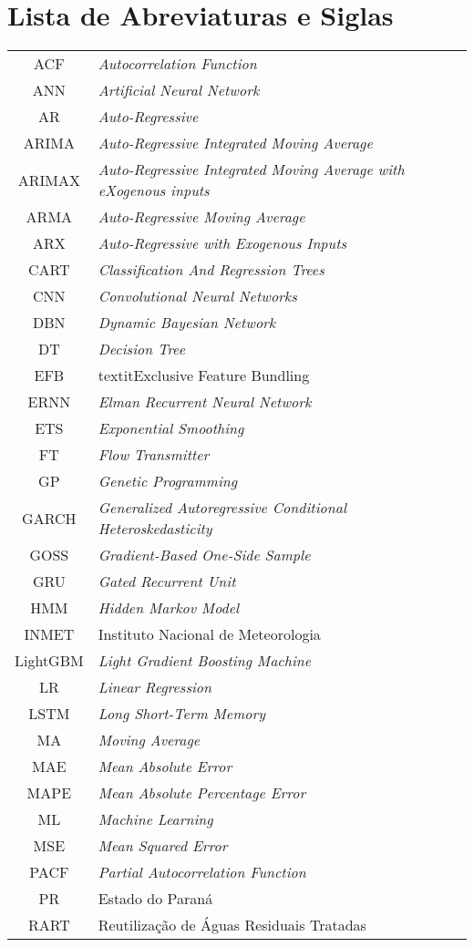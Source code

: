 \newpage
{}
\section*{Lista de Abreviaturas e Siglas}



\begin{tabular}{cp{}}
	ACF & \textit{Autocorrelation Function}\\
	ANN & \textit{Artificial Neural Network} \\
	AR & \textit{Auto-Regressive}\\
	ARIMA & \textit{Auto-Regressive Integrated Moving Average} \\
	ARIMAX & \textit{Auto-Regressive Integrated Moving Average with eXogenous inputs}\\
	ARMA & \textit{Auto-Regressive Moving Average} \\
	ARX & \textit{Auto-Regressive with Exogenous Inputs}\\
	CART & \textit{Classification And Regression Trees} \\
	CNN & \textit{Convolutional Neural Networks}\\
	DBN & \textit{Dynamic Bayesian Network} \\
	DT & \textit{Decision Tree} \\
	EFB & textit{Exclusive Feature Bundling}\\
	ERNN & \textit{Elman Recurrent Neural Network} \\
	ETS & \textit{Exponential Smoothing} \\
	FT & \textit{Flow Transmitter}\\
	GP & \textit{Genetic Programming}\\
	GARCH & \textit{Generalized Autoregressive Conditional Heteroskedasticity}\\
	GOSS & \textit{Gradient-Based One-Side Sample}\\
	GRU & \textit{Gated Recurrent Unit} \\
	HMM & \textit{Hidden Markov Model}\\
	INMET & Instituto Nacional de Meteorologia\\
	LightGBM & \textit{Light Gradient Boosting Machine} \\
	LR & \textit{Linear Regression}\\
	LSTM &\textit{Long Short-Term Memory}	\\
	MA & \textit{Moving Average}\\
	MAE & \textit{Mean Absolute Error}\\
	MAPE & \textit{Mean Absolute Percentage Error}\\
	ML & \textit{Machine Learning}	\\
	MSE & \textit{Mean Squared Error}\\
	PACF & \textit{Partial Autocorrelation Function}\\
	PR & Estado do Paraná\\
	RART & Reutilização de Águas Residuais Tratadas\\
\end{tabular}

